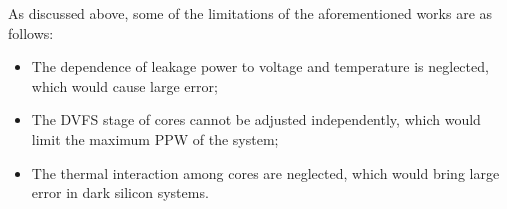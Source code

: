 As discussed above, some of the limitations of the aforementioned works are as follows:
\begin{itemize}  
\item The dependence of leakage power to voltage and temperature is neglected, which would cause large error;
\item The DVFS stage of cores cannot be adjusted independently, which would limit the maximum PPW of the system;
\item The thermal interaction among cores are neglected, which would bring large error in dark silicon systems.
\end{itemize} 

